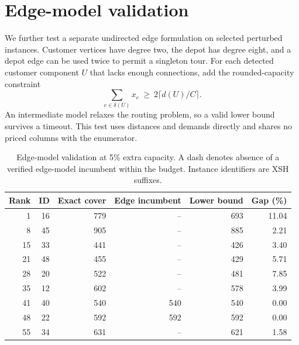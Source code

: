 \documentclass[runningheads]{llncs}
\begin{document}
\section{Edge-model validation}
We further test a separate undirected edge formulation on selected perturbed instances. Customer vertices have degree two, the depot has degree eight, and a depot edge can be used twice to permit a singleton tour. For each detected customer component $U$ that lacks enough connections, add the rounded-capacity constraint
\begin{equation}
 \sum_{e\in\delta(U)}x_e\ \geq\ 2\lceil d(U)/C\rceil.
\end{equation}
An intermediate model relaxes the routing problem, so a valid lower bound survives a timeout. This test uses distances and demands directly and shares no priced columns with the enumerator.


\begin{table}[htbp]\centering
\caption{Edge-model validation at 5\% extra capacity. A dash denotes absence of a verified edge-model incumbent within the budget. Instance identifiers are XSH suffixes.}\label{tab:arc}
\begin{tabular}{rrrrrr}\toprule
Rank & ID & Exact cover & Edge incumbent & Lower bound & Gap (\%)\\\midrule
1&16&779&--&693&11.04\\
8&45&905&--&885&2.21\\
15&33&441&--&426&3.40\\
21&48&455&--&429&5.71\\
28&20&522&--&481&7.85\\
35&12&602&--&578&3.99\\
41&40&540&540&540&0.00\\
48&22&592&592&592&0.00\\
55&34&631&--&621&1.58\\\bottomrule
\end{tabular}
\end{table}
\end{document}
